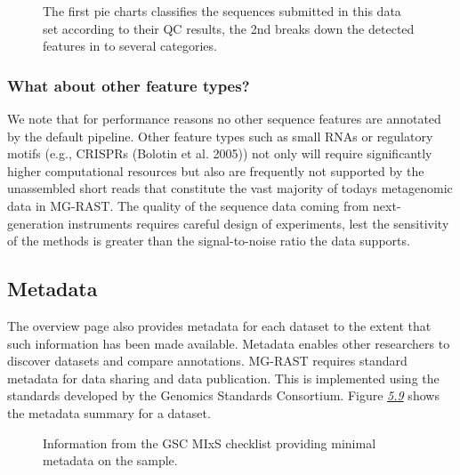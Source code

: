 \documentclass[letterpaper,10pt,english]{sphinxmanual}
\begin{document}
\begin{figure}[htbp]
\centering
\capstart

\noindent{}
\caption{The first pie charts classifies the sequences submitted in this data
set according to their QC results, the 2nd breaks down the detected
features in to several categories.}\label{\detokenize{user_manual:fig-classification-pie-chart}}\end{figure}


\subsubsection{What about other feature types?}
\label{\detokenize{user_manual:what-about-other-feature-types}}
We note that for performance reasons no other sequence features are
annotated by the default pipeline. Other feature types such as small
RNAs or regulatory motifs (e.g., CRISPRs (Bolotin et al. 2005)) not only
will require significantly higher computational resources but also are
frequently not supported by the unassembled short reads that constitute
the vast majority of todays metagenomic data in MG-RAST. The quality of
the sequence data coming from next-generation instruments requires
careful design of experiments, lest the sensitivity of the methods is
greater than the signal-to-noise ratio the data supports.


\subsection{Metadata}
\label{\detokenize{user_manual:id4}}
The overview page also provides metadata for each dataset to the extent
that such information has been made available. Metadata enables other
researchers to discover datasets and compare annotations. MG-RAST
requires standard metadata for data sharing and data publication. This
is implemented using the standards developed by the Genomics Standards
Consortium. Figure {\hyperref[\detokenize{user_manual:fig:GSC-MIxS-checklist-information}]{\emph{5.9}}} shows
the metadata summary for a dataset.

\begin{figure}[htbp]
\centering
\capstart

\noindent{}
\caption{Information from the GSC MIxS checklist providing minimal metadata on
the sample.}\label{\detokenize{user_manual:fig-gsc-mixs-checklist-information}}\end{figure}
\end{document}
